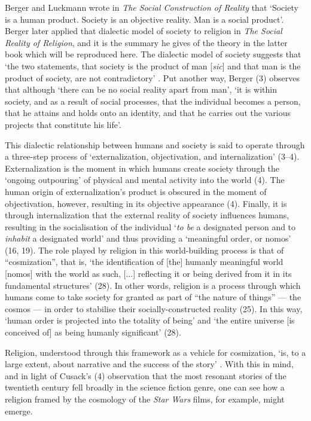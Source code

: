 \documentclass{article}
\begin{document}
Berger and Luckmann \parencite*[79]{Berger67} wrote in
\textit{The Social Construction of Reality} that
`Society is a human product. Society is an objective reality.
Man is a social product'.
Berger later applied that dialectic model of society to religion
in \textit{The Social Reality of Religion},
and it is the summary he gives of the theory
in the latter book which will be reproduced here.
The dialectic model of society suggests that
`the two statements, that society is the product of man
[\textit{sic}] and that
man is the product of society, are not contradictory'
\parencite[3]{Berger69}.
Put another way, Berger (3) observes that although
`there can be no social reality apart from man',
`it is within society, and as a result of social processes,
that the individual becomes a person,
that he attains and holds onto an identity,
and that he carries out the various projects that constitute his life'.

This dialectic relationship between humans and society is said to operate
through a three-step process of
`externalization, objectivation, and internalization' (3--4).
Externalization is the moment in which humans create society
through the `ongoing outpouring' of physical and mental activity
into the world (4).
The human origin of externalization's product is obscured
in the moment of objectivation, however,
resulting in its objective appearance (4).
Finally, it is through internalization that the external
reality of society influences humans, resulting in
the socialisation of the individual
`\textit{to be} a designated person
and to \textit{inhabit} a designated world'
and thus providing a `meaningful order, or nomos' (16, 19).
The role played by religion in this world-building process
is that of ``cosmization'', that is,
`the identification of [the] humanly meaningful world [nomos]
with the world as such, [...] reflecting it or being derived from it
in its fundamental structures' (28).
In other words, religion is a process through which humans
come to take society for granted as part of ``the nature of things''
--- the cosmos --- in order to stabilise their socially-constructed reality (25).
In this way, `human order is projected into the totality of being'
and `the entire universe [is conceived of] as being humanly significant' (28).

Religion, understood through this framework as a vehicle for cosmization,
`is, to a large extent, about narrative
and the success of the story' \parencite[4]{Cusack10}.
With this in mind, and in light of Cusack's (4) observation
that the most resonant stories of the twentieth century
fell broadly in the science fiction genre,
one can see how a religion framed by the cosmology of
the \textit{Star Wars} films, for example, might emerge.



\printbibliography
\end{document}
